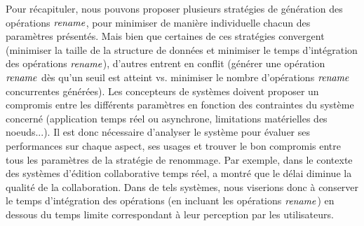 Pour récapituler, nous pouvons proposer plusieurs stratégies de génération des opérations $\mathit{rename}$, pour minimiser de manière individuelle chacun des paramètres présentés.
Mais bien que certaines de ces stratégies convergent (minimiser la taille de la structure de données et minimiser le temps d'intégration des opérations $\mathit{rename}$), d'autres entrent en conflit (générer une opération $\mathit{rename}$ dès qu'un seuil est atteint vs. minimiser le nombre d'opérations $\mathit{rename}$ concurrentes générées).
Les concepteurs de systèmes doivent proposer un compromis entre les différents paramètres en fonction des contraintes du système concerné (application temps réel ou asynchrone, limitations matérielles des noeuds...).
Il est donc nécessaire d'analyser le système pour évaluer ses performances sur chaque aspect, ses usages et trouver le bon compromis entre tous les paramètres de la stratégie de renommage.
Par exemple, dans le contexte des systèmes d'édition collaborative temps réel, \cite{2014-effect-delay-collaborative-editing-ignat} a montré que le délai diminue la qualité de la collaboration.
Dans de tels systèmes, nous viserions donc à conserver le temps d'intégration des opérations (en incluant les opérations $\mathit{rename}$) en dessous du temps limite correspondant à leur perception par les utilisateurs.
